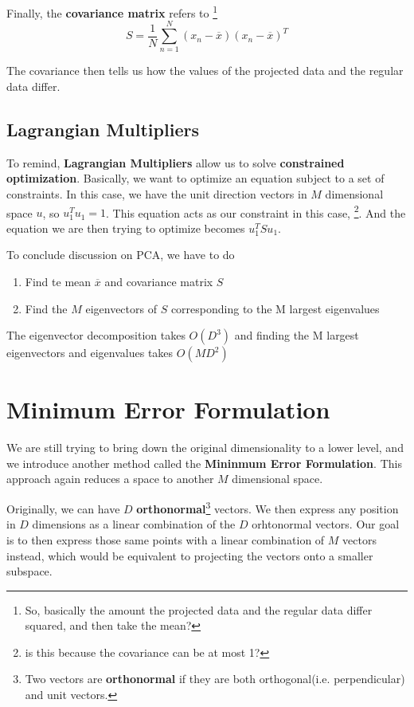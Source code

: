 \documentclass{tufte-handout}
\begin{document}
Finally, the \textbf{covariance matrix} refers to \footnote{So, basically the amount the projected
data and the regular data differ squared, and then take the mean?}
\[ S = \frac{1}{N}\sum_{n=1}^{N}(x_{n} - \overline{x})(x_{n} - \overline{x})^{T}\]

The covariance then tells us how the values of the projected data and the regular data differ. 
\subsection{Lagrangian Multipliers}
To remind, \textbf{Lagrangian Multipliers} allow us to solve \textbf{constrained optimization}. Basically,
we want to optimize an equation subject to a set of constraints. In this case, we have the unit direction vectors
in $M$ dimensional space $u$, so $u_{1}^{T}u_{1} = 1$. This equation acts as our constraint in this case,
\footnote{is this because the covariance can be at most 1?}. And the equation we are then trying to optimize
becomes $u^{T}_{1}Su_{1}$.  

To conclude discussion on PCA, we have to do
\begin{enumerate}
		\item{Find te mean $\overline{x}$ and covariance matrix $S$}
		\item{Find the $M$ eigenvectors of $S$ corresponding to the M largest eigenvalues}
\end{enumerate}
The	eigenvector decomposition takes $O(D^{3})$ and finding the M largest eigenvectors and eigenvalues 
takes $O(MD^{2})$
\section{Minimum Error Formulation}
We are still trying to bring down the original dimensionality to a lower level, and we introduce another 
method called the \textbf{Mininmum Error Formulation}. This approach again reduces a space to another 
$M$ dimensional space. 

Originally, we can have $D$ \textbf{orthonormal}\footnote{Two vectors are \textbf{orthonormal} if they are
both orthogonal(i.e. perpendicular) and unit vectors.} vectors. We then express any position in $D$ dimensions
as a linear combination of the $D$ orhtonormal vectors. Our goal is to then express those same points with a
linear combination of $M$ vectors instead, which would be equivalent to projecting the vectors onto a smaller
subspace.
\end{document}
